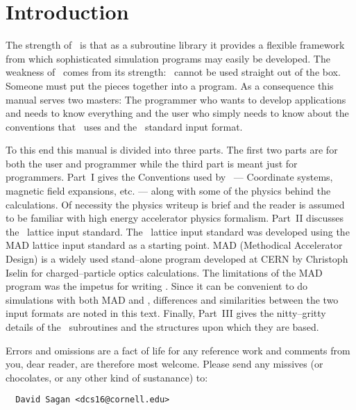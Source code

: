 \section*{Introduction}

The strength of \bmad\ is that as a subroutine library it provides a
flexible framework from which sophisticated simulation programs may
easily be developed.  The weakness of \bmad\ comes from its strength:
\bmad\ cannot be used straight out of the box. Someone must put the
pieces together into a program. As a consequence this manual serves
two masters: The programmer who wants to develop applications and
needs to know everything and the user who simply needs to know about
the conventions that \bmad\ uses and the \bmad\ standard input format.

To this end this manual is divided into three parts. The first two
parts are for both the user and programmer while the third part is
meant just for programmers. Part~I gives the Conventions used by
\bmad\ --- Coordinate systems, magnetic field expansions, etc. ---
along with some of the physics behind the calculations. Of necessity
the physics writeup is brief and the reader is assumed to be familiar
with high energy accelerator physics formalism. Part~II discusses the
\bmad\ lattice input standard.  The \bmad\ lattice input standard was
developed using the MAD lattice input standard as a starting
point. MAD (Methodical Accelerator Design) is a widely used
stand--alone program developed at CERN by Christoph Iselin for
charged--particle optics calculations. The limitations of the MAD
program was the impetus for writing \bmad. Since it can be convenient
to do simulations with both MAD and \bmad, differences and
similarities between the two input formats are noted in this
text. Finally, Part~III gives the nitty--gritty details of the \bmad\
subroutines and the structures upon which they are based.

Errors and omissions are a fact of life for any reference work and
comments from you, dear reader, are therefore most welcome. Please
send any missives (or chocolates, or any other kind of sustanance) to:
\begin{verbatim}
  David Sagan <dcs16@cornell.edu>
\end{verbatim}
